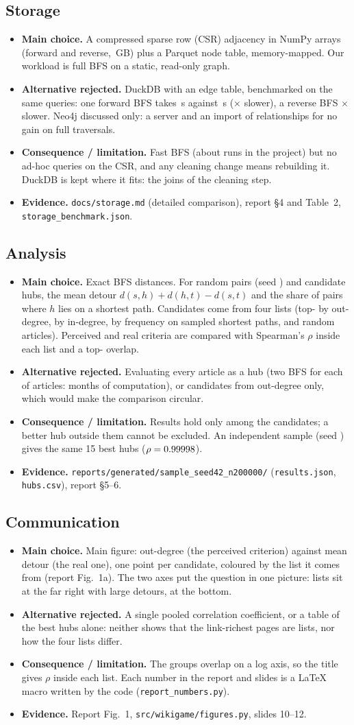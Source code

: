 \documentclass[10pt,a4paper]{article}
\newcommand{\stage}[5]{\subsection*{#1}
\begin{itemize}
\item \textbf{Main choice.} #2
\item \textbf{Alternative rejected.} #3
\item \textbf{Consequence / limitation.} #4
\item \textbf{Evidence.} #5
\end{itemize}}
\begin{document}
\stage{Storage}
{A compressed sparse row (CSR) adjacency in NumPy arrays (forward and reverse,
\CsrDiskGB\,GB) plus a Parquet node table, memory-mapped. Our workload is full BFS on a static,
read-only graph.}
{DuckDB with an edge table, benchmarked on the same queries: one forward BFS takes \DuckBfsS\,s
against \CsrBfsS\,s (\DuckBfsRatio$\times$ slower), a reverse BFS \DuckRevBfsRatio$\times$ slower.
Neo4j discussed only: a server and an import of \NEdges{} relationships for no gain on full
traversals.}
{Fast BFS (about \NBfsRuns{} runs in the project) but no ad-hoc queries on the CSR, and any
cleaning change means rebuilding it. DuckDB is kept where it fits: the joins of the cleaning step.}
{\texttt{docs/storage.md} (detailed comparison), report §4 and Table~2,
\texttt{storage\_benchmark.json}.}

\stage{Analysis}
{Exact BFS distances. For \NPairs{} random pairs (seed \Seed) and \NCandidates{} candidate hubs,
the mean detour $d(s,h)+d(h,t)-d(s,t)$ and the share of pairs where $h$ lies on a shortest path.
Candidates come from four lists (top-\TopK{} by out-degree, by in-degree, by frequency on sampled
shortest paths, and \NRandomBaseline{} random articles). Perceived and real criteria are compared
with Spearman's $\rho$ inside each list and a top-\TopOverlapK{} overlap.}
{Evaluating every article as a hub (two BFS for each of \NEligible{} articles: months of computation), or
candidates from out-degree only, which would make the comparison circular.}
{Results hold only among the candidates; a better hub outside them cannot be excluded. An
independent sample (seed \OtherSeed) gives the same 15 best hubs \SeedTopFifteenOrder{}
($\rho=0.99998$).}
{\texttt{reports/generated/sample\_seed42\_n200000/} (\texttt{results.json}, \texttt{hubs.csv}), report §5–6.}

\stage{Communication}
{Main figure: out-degree (the perceived criterion) against mean detour (the real one), one point
per candidate, coloured by the list it comes from (report Fig.~1a). The two axes put the question
in one picture: lists sit at the far right with large detours, \BestHub{} at the bottom.}
{A single pooled correlation coefficient, or a table of the best hubs alone: neither shows that
the link-richest pages are lists, nor how the four lists differ.}
{The groups overlap on a log axis, so the title gives $\rho$ inside each list. Each number in the
report and slides is a LaTeX macro written by the code (\texttt{report\_numbers.py}).}
{Report Fig.~1, \texttt{src/wikigame/figures.py}, slides 10--12.}
\end{document}
